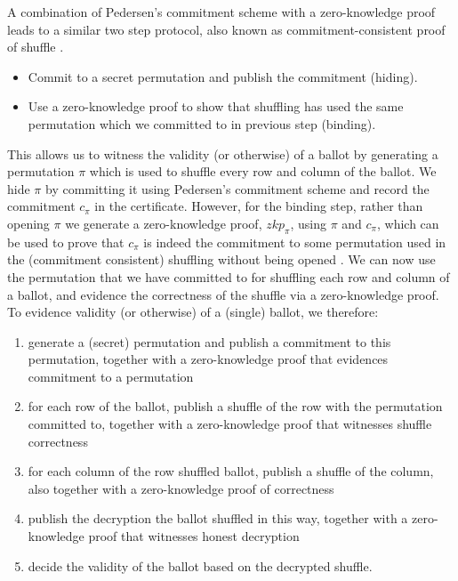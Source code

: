 \noindent
A combination of Pedersen's commitment scheme 
with a zero-knowledge proof leads to a similar two step protocol, also known 
as commitment-consistent proof of shuffle \citep{Wikstrom:2009:CPS}.

\begin{itemize}
\item Commit to a secret permutation and publish the commitment (hiding).
\item Use a zero-knowledge proof to show that shuffling has used 
      the same permutation which we committed to in previous step (binding).
\end{itemize}  

\noindent
This allows us to witness the validity (or otherwise) of a ballot by generating a 
permutation $\pi$ which is used to shuffle every row and column of the ballot.
We hide $\pi$ by committing it using Pedersen's 
commitment scheme 
and record the commitment $c_{\pi}$ in the certificate. However, for the binding step, rather 
than opening $\pi$ we generate a zero-knowledge proof, $zkp_{\pi}$, 
using $\pi$ and $c_{\pi}$, which can 
be  used to prove that $c_{\pi}$ is indeed the commitment to some permutation
used in the (commitment consistent) shuffling 
 without being opened \citep{Wikstrom:2009:CPS}. We can now use the
 permutation that we have committed to for 
shuffling each row and column of a ballot, and evidence the
correctness of the shuffle via a zero-knowledge proof.
%
To evidence validity (or otherwise) of a (single) ballot, we
therefore:
\begin{enumerate}
  \item generate a (secret) permutation and publish a commitment to this
  permutation, together with a zero-knowledge proof that evidences commitment
  to a permutation
  \item for each row of the ballot, publish a shuffle of the row with
  the permutation committed to, together with a zero-knowledge proof
  that witnesses shuffle correctness
  \item for each column of the row shuffled ballot, publish a
  shuffle of the column, also together with a zero-knowledge proof of
  correctness 
  \item publish the decryption the ballot shuffled in this way, together with a
  zero-knowledge proof that witnesses honest decryption
  \item decide the validity of the ballot based on the decrypted
  shuffle.
\end{enumerate}

